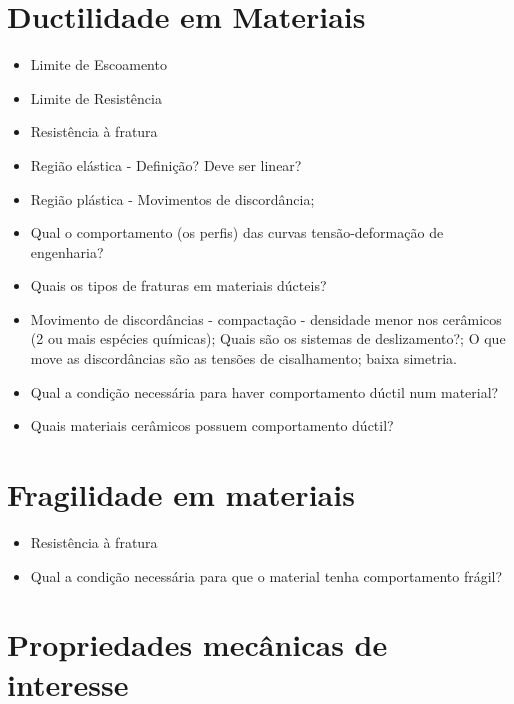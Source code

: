 
\section*{Ductilidade em Materiais}

  \begin{itemize}
    \item Limite de Escoamento
    \item Limite de Resistência
    \item Resistência à fratura
    \item Região elástica - Definição? Deve ser linear? 
    \item Região plástica - Movimentos de discordância;
    \item Qual o comportamento (os perfis) das curvas tensão-deformação de engenharia?
    \item Quais os tipos de fraturas em materiais dúcteis?
    \item Movimento de discordâncias - compactação - densidade menor nos cerâmicos (2 ou mais espécies químicas); Quais são os sistemas de deslizamento?; O que move as discordâncias são as tensões de cisalhamento; baixa simetria.
    \item Qual a condição necessária para haver comportamento dúctil num material?
    \item Quais materiais cerâmicos possuem comportamento dúctil?
  \end{itemize}

\section*{Fragilidade em materiais}

  \begin{itemize}
    \item Resistência à fratura
    \item Qual a condição necessária para que o material tenha comportamento frágil?
  \end{itemize}

\section*{Propriedades mecânicas de interesse}

